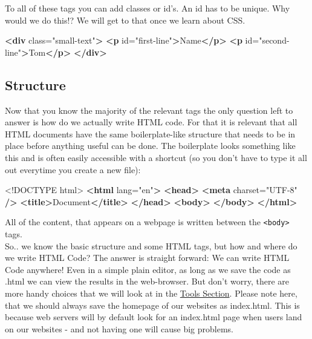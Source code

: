 \documentclass[
]{book}
\newenvironment{Shaded}{\begin{snugshade}}{\end{snugshade}}
\newcommand{\DataTypeTok}[1]{\textcolor[rgb]{0.13,0.29,0.53}{#1}}
\newcommand{\KeywordTok}[1]{\textcolor[rgb]{0.13,0.29,0.53}{\textbf{#1}}}
\newcommand{\NormalTok}[1]{#1}
\newcommand{\OtherTok}[1]{\textcolor[rgb]{0.56,0.35,0.01}{#1}}
\newcommand{\StringTok}[1]{\textcolor[rgb]{0.31,0.60,0.02}{#1}}
\begin{document}
To all of these tags you can add classes or id's. An id has to be unique. Why would we do this!? We will get to that once we learn about CSS.

\begin{Shaded}
\begin{Highlighting}[]
\KeywordTok{\textless{}div}\OtherTok{ class=}\StringTok{"small{-}text"}\KeywordTok{\textgreater{}}
  \KeywordTok{\textless{}p}\OtherTok{ id=}\StringTok{"first{-}line"}\KeywordTok{\textgreater{}}\NormalTok{Name}\KeywordTok{\textless{}/p\textgreater{}}
  \KeywordTok{\textless{}p}\OtherTok{ id=}\StringTok{"second{-}line"}\KeywordTok{\textgreater{}}\NormalTok{Tom}\KeywordTok{\textless{}/p\textgreater{}}
\KeywordTok{\textless{}/div\textgreater{}}
\end{Highlighting}
\end{Shaded}

\hypertarget{structure}{%
\subsection*{Structure}\label{structure}}

Now that you know the majority of the relevant tags the only question left to answer is how do we actually write HTML code. For that it is relevant that all HTML documents have the same boilerplate-like structure that needs to be in place before anything useful can be done. The boilerplate looks something like this and is often easily accessible with a shortcut (so you don't have to type it all out everytime you create a new file):

\begin{Shaded}
\begin{Highlighting}[]
\DataTypeTok{\textless{}!DOCTYPE }\NormalTok{html}\DataTypeTok{\textgreater{}}
\KeywordTok{\textless{}html}\OtherTok{ lang=}\StringTok{"en"}\KeywordTok{\textgreater{}}
  \KeywordTok{\textless{}head\textgreater{}}
    \KeywordTok{\textless{}meta}\OtherTok{ charset=}\StringTok{"UTF{-}8"} \KeywordTok{/\textgreater{}}
    \KeywordTok{\textless{}title\textgreater{}}\NormalTok{Document}\KeywordTok{\textless{}/title\textgreater{}}
  \KeywordTok{\textless{}/head\textgreater{}}
  \KeywordTok{\textless{}body\textgreater{}}
  \KeywordTok{\textless{}/body\textgreater{}}
\KeywordTok{\textless{}/html\textgreater{}}
\end{Highlighting}
\end{Shaded}

All of the content, that appears on a webpage is written between the \texttt{\textless{}body\textgreater{}} tags.\\
So.. we know the basic structure and some HTML tags, but how and where do we write HTML Code? The answer is straight forward: We can write HTML Code anywhere! Even in a simple plain editor, as long as we save the code as .html we can view the results in the web-browser. But don't worry, there are more handy choices that we will look at in the \protect\hyperlink{tools}{Tools Section}. Please note here, that we should always save the homepage of our websites as index.html. This is because web servers will by default look for an index.html page when users land on our websites - and not having one will cause big problems.
\end{document}
